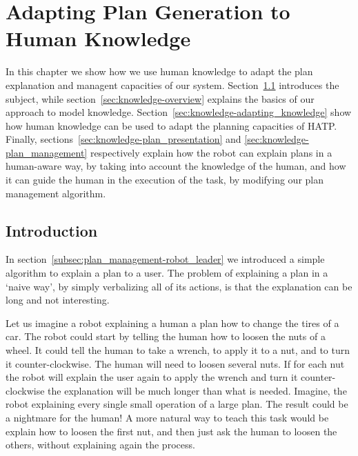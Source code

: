 \chapter{Adapting Plan Generation to Human Knowledge} %

\label{chapter:plan_execution} %



  
In this chapter we show how we use human knowledge to adapt the plan explanation and managent capacities of our system. Section~\ref{sec:knowledge-intro} introduces the subject, while section~\ref{sec:knowledge-overview} explains the basics of our approach to model knowledge. Section~\ref{sec:knowledge-adapting_knowledge} show how human knowledge can be used to adapt the planning capacities of HATP. Finally, sections~\ref{sec:knowledge-plan_presentation} and \ref{sec:knowledge-plan_management} respectively explain how the robot can explain plans in a human-aware way, by taking into account the knowledge of the human, and how it can guide the human in the execution of the task, by modifying our plan management algorithm.


\section{Introduction}
\label{sec:knowledge-intro}

In section~\ref{subsec:plan_management-robot_leader} we introduced a simple algorithm to explain a plan to a user. The problem of explaining a plan in a `naive way', by simply verbalizing all of its actions, is that the explanation can be long and not interesting. 

Let us imagine a robot explaining a human a plan how to change the tires of a car. The robot could start by telling the human how to loosen the nuts of a wheel. It could tell the human to take a wrench, to apply it to a nut, and to turn it counter-clockwise. The human will need to loosen several nuts. If for each nut the robot will explain the user again to apply the wrench and turn it counter-clockwise the explanation will be much longer than what is needed. Imagine, the robot explaining every single small operation of a large plan. The result could be a nightmare for the human! A more natural way to teach this task would be explain how to loosen the first nut, and then just ask the human to loosen the others, without explaining again the process.

